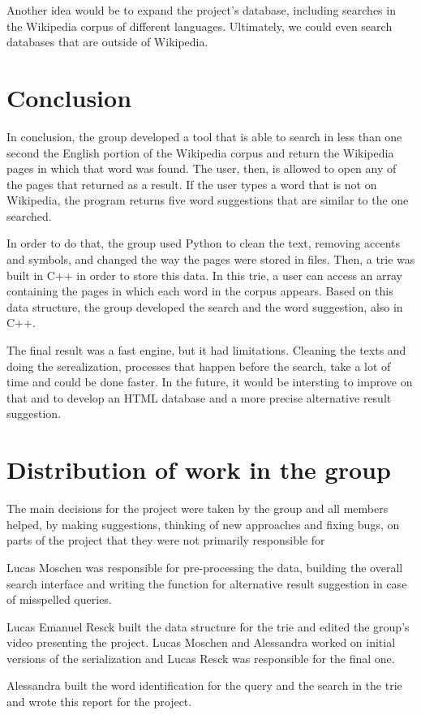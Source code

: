 \documentclass{article}
\begin{document}
Another idea would be to expand the project's database, including searches in the Wikipedia corpus of different languages. Ultimately, we could even search databases that are outside of Wikipedia. 

\section*{Conclusion}
In conclusion, the group developed a tool that is able to search in less than one second the English portion of the Wikipedia corpus and return the Wikipedia pages in which that word was found. The user, then, is allowed to open any of the pages that returned as a result. If the user types a word that is not on Wikipedia, the program returns five word suggestions that are similar to the one searched. 

In order to do that, the group used Python to clean the text, removing accents and symbols, and changed the way the pages were stored in files. Then, a trie was built in C++ in order to store this data. In this trie, a user can access an array containing the pages in which each word in the corpus appears. Based on this data structure, the group developed the search and the word suggestion, also in C++. 

The final result was a fast engine, but it had limitations. Cleaning the texts and doing the serealization, processes that happen before the search, take a lot of time and could be done faster. In the future, it would be intersting to improve on that and to develop an HTML database and a more precise alternative result suggestion. 

\section*{Distribution of work in the group}
The main decisions for the project were taken by the group and all members helped, by making suggestions, thinking of new approaches and fixing bugs, on parts of the project that they were not primarily responsible for

Lucas Moschen was responsible for pre-processing the data, building the overall search interface and writing the function for alternative result suggestion in case of misspelled queries. 

Lucas Emanuel Resck built the data structure for the trie and edited the group's video presenting the project. Lucas Moschen and Alessandra worked on initial versions of the serialization and Lucas Resck was responsible for the final one. 

Alessandra built the word identification for the query and the search in the trie and wrote this report for the project. 

\end{document}
